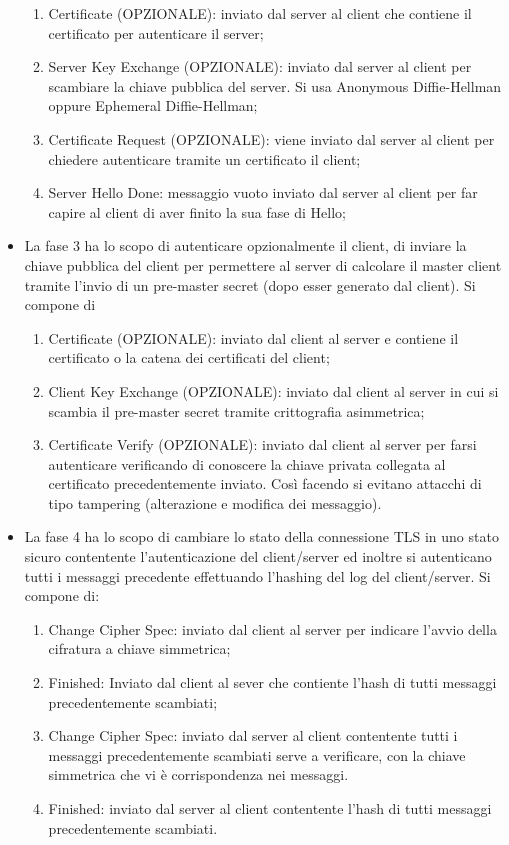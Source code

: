\documentclass{article}
\begin{document}
\begin{itemize}
\begin{enumerate}
        \item Certificate (OPZIONALE): inviato dal server al client che contiene il certificato per autenticare il server;
        \item Server Key Exchange (OPZIONALE): inviato dal server al client per scambiare la chiave pubblica del server\@. Si usa Anonymous Diffie-Hellman oppure Ephemeral Diffie-Hellman;
        \item Certificate Request (OPZIONALE): viene inviato dal server al client per chiedere autenticare tramite un certificato il client;
        \item Server Hello Done: messaggio vuoto inviato dal server al client per far capire al client di aver finito la sua fase di Hello;
    \end{enumerate}
    \item La fase 3 ha lo scopo di autenticare opzionalmente il client, di inviare la chiave pubblica del client per permettere al server di calcolare il master client tramite l'invio di un pre-master secret (dopo esser generato dal client)\@. Si compone di \begin{enumerate}
        \item Certificate (OPZIONALE): inviato dal client al server e contiene il certificato o la catena dei certificati del client;
        \item Client Key Exchange (OPZIONALE): inviato dal client al server in cui si scambia il pre-master secret tramite crittografia asimmetrica;
        \item Certificate Verify (OPZIONALE): inviato dal client al server per farsi autenticare verificando di conoscere la chiave privata collegata al certificato precedentemente inviato\@. Così facendo si evitano attacchi di tipo tampering (alterazione e modifica dei messaggio).
    \end{enumerate}
    \item La fase 4 ha lo scopo di cambiare lo stato della connessione TLS in uno stato sicuro contentente l'autenticazione del client/server ed inoltre si autenticano tutti i messaggi precedente effettuando l'hashing del log del client/server\@. Si compone di:\begin{enumerate}
        \item Change Cipher Spec: inviato dal client al server per indicare l'avvio della cifratura a chiave simmetrica;
        \item Finished: Inviato dal client al sever che contiente l'hash di tutti messaggi precedentemente scambiati;
        \item Change Cipher Spec: inviato dal server al client contentente tutti i messaggi precedentemente scambiati serve a verificare, con la chiave simmetrica che vi è corrispondenza nei messaggi.
        \item Finished: inviato dal server al client contentente l'hash di tutti messaggi precedentemente scambiati.
    \end{enumerate}
\end{itemize}
\end{document}
